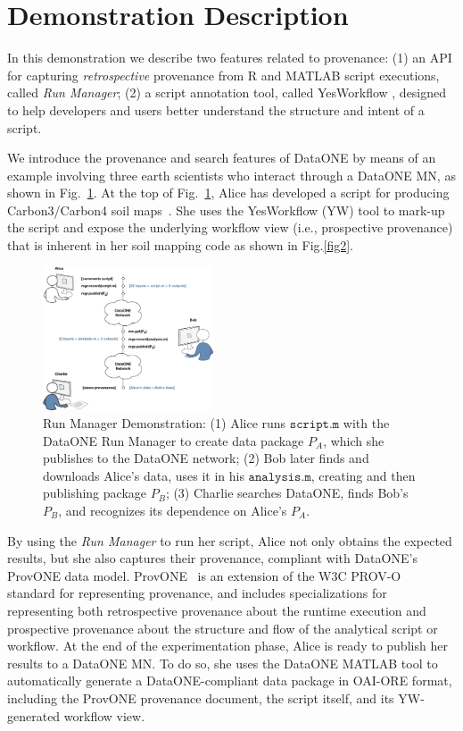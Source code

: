 \documentclass[a4paper]{llncs}
\newcommand{\mytt}[1]{\ensuremath{\mathtt{#1}}}
\begin{document}
\section{Demonstration Description}  \label{demo}

In this demonstration we describe two features related to provenance: (1) an API for capturing \textit{retrospective} provenance from R \cite{recordr} and MATLAB \cite{matlabdataone} script executions, called \emph{Run Manager}; (2) a script annotation tool, called YesWorkflow \cite{yesworkflow}, designed to help developers and users better understand the structure and intent of a script.

We introduce the provenance and search features of DataONE by means of an example involving three earth scientists who interact through a DataONE MN, as shown in Fig.~\ref{fig0}.  At the top of Fig.~\ref{fig0}, Alice has developed a script for producing Carbon3/Carbon4 soil maps~\cite{MsTMIP-model-driver-data-set}.  She uses the YesWorkflow (YW) tool to mark-up the script and expose the underlying workflow view (i.e., prospective provenance) that is inherent in her soil mapping code as shown in Fig.\ref{fig2}. 

\begin{figure}[t]  
\centering 
\includegraphics[width=0.45\textwidth]{figs/alice-bob-charlie-sequence-crop} \caption{Run Manager Demonstration: (1) Alice runs \mytt{script.m} with the DataONE Run Manager to create data package $P_A$, which she publishes to the DataONE network; (2) Bob later finds and downloads Alice's data, uses it in his \mytt{analysis.m}, creating and then publishing package $P_B$; (3) Charlie searches DataONE, finds Bob's $P_B$, and recognizes its dependence on Alice's $P_A$.}  \label{fig0} 
\end{figure}

By using the \emph{Run Manager} to run her script, Alice not only obtains the expected results, but she also captures their provenance, compliant with DataONE's ProvONE data model. 
ProvONE~\cite{provone} is an extension of the W3C PROV-O~\cite{prov-o} standard for representing provenance, and includes specializations for representing both retrospective provenance about the runtime execution and prospective provenance about the structure and flow of the analytical script or workflow.
%
At the end of the experimentation phase, Alice is ready to publish her results to a DataONE MN. 
To do so, she uses the  DataONE MATLAB tool to automatically generate a DataONE-compliant data package in OAI-ORE format, including the ProvONE provenance document, the script itself, and its YW-generated workflow view. 
\end{document}
